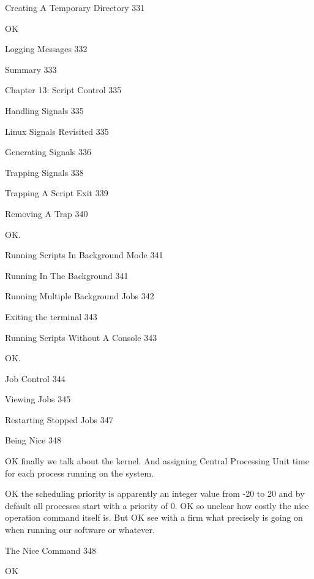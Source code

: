 Creating A Temporary Directory 331

OK

Logging Messages 332



Summary 333



Chapter 13: Script Control 335



Handling Signals 335



Linux Signals Revisited 335



Generating Signals 336



Trapping Signals 338



Trapping A Script Exit 339



Removing A Trap 340

OK.

Running Scripts In Background Mode 341



Running In The Background 341



Running Multiple Background Jobs 342



Exiting the terminal 343



Running Scripts Without A Console 343

OK.

Job Control 344



Viewing Jobs 345



Restarting Stopped Jobs 347



Being Nice 348

OK finally we talk about the kernel. And assigning Central Processing Unit time for each process running on the system.

OK the scheduling priority is apparently an integer value from -20 to 20 and by default all processes start with a priority of 0. OK so unclear how costly the nice operation command itself is. But OK see with a firm what precisely is going on when running our software or whatever.

The Nice Command 348

OK

